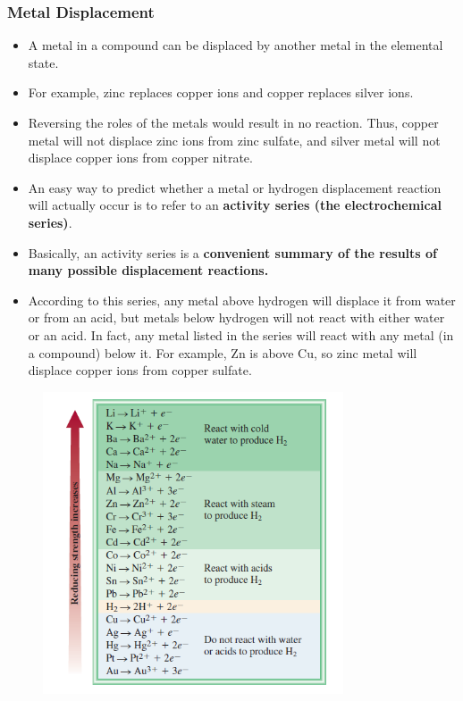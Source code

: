 \documentclass[a4paper,12pt,twocolumn]{article}
\begin{document}
\subsubsection{Metal Displacement}
\begin{itemize}
\item A metal in a compound can be displaced by another metal in the elemental state. 
\item For example, zinc replaces copper ions and copper replaces silver ions. 
\item Reversing the roles of the metals would result in no reaction. Thus, copper metal will not displace zinc ions from zinc sulfate, and silver metal will not displace copper ions from copper nitrate.
\item An easy way to predict whether a metal or hydrogen displacement reaction will actually occur is to refer to an \textbf{activity series (the electrochemical series)}. 
\item Basically, an activity series is a \textbf{convenient summary of the results of many possible displacement reactions.}
\item According to this series, any metal above hydrogen will displace it from water or from an acid, but metals below hydrogen will not react with either water or an acid. In fact, any metal listed in the series will react with any metal (in a compound) below it. For example, Zn is above Cu, so zinc metal will displace copper ions from copper sulfate.
\end{itemize}
\begin{figure}[h]
\centering
\includegraphics[width=3.5in]{activity.png}
\end{figure}
\end{document}
